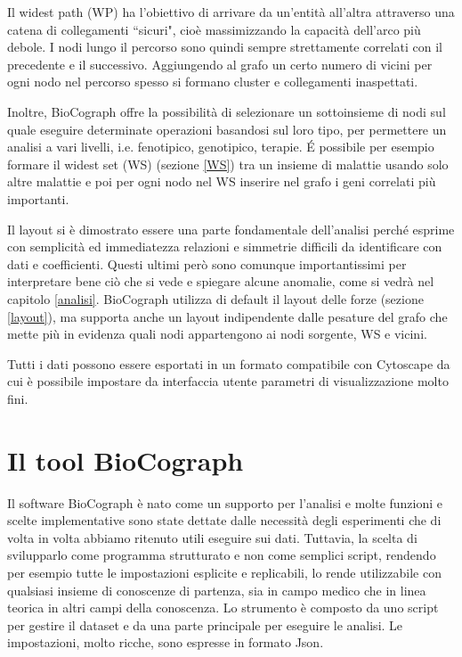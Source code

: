 \documentclass[12pt]{report}
\newcommand{\quotes}[1]{``#1"}
\begin{document}
Il widest path (WP) ha l'obiettivo di arrivare da un'entità all'altra attraverso una catena di collegamenti \quotes{sicuri}, cioè massimizzando la capacità dell'arco più debole. I nodi lungo il percorso sono quindi sempre strettamente correlati con il precedente e il successivo. Aggiungendo al grafo un certo numero di vicini per ogni nodo nel percorso spesso si formano cluster e collegamenti inaspettati.

Inoltre, BioCograph offre la possibilità di selezionare un sottoinsieme di nodi sul quale eseguire determinate operazioni basandosi sul loro tipo, per permettere un analisi a vari livelli, i.e. fenotipico, genotipico, terapie. \'E possibile per esempio formare il widest set (WS) (sezione \ref{WS}) tra un insieme di malattie usando solo altre malattie e poi per ogni nodo nel WS inserire nel grafo i geni correlati più importanti.

Il layout si è dimostrato essere una parte fondamentale dell'analisi perché esprime con semplicità ed immediatezza relazioni e simmetrie difficili da identificare con dati e coefficienti. Questi ultimi però sono comunque importantissimi per interpretare bene ciò che si vede e spiegare alcune anomalie, come si vedrà nel capitolo \ref{analisi}. BioCograph utilizza di default il layout delle forze (sezione \ref{layout}), ma supporta anche un layout indipendente dalle pesature del grafo che mette più in evidenza quali nodi appartengono ai nodi sorgente, WS e vicini.

Tutti i dati possono essere esportati in un formato compatibile con Cytoscape da cui è possibile impostare da interfaccia utente parametri di visualizzazione molto fini.



\chapter{Il tool BioCograph}
 Il software BioCograph è nato come un supporto per l'analisi e molte funzioni e scelte implementative sono state dettate dalle necessità degli esperimenti che di volta in volta abbiamo ritenuto utili eseguire sui dati. Tuttavia, la scelta di svilupparlo come programma strutturato e non come semplici script, rendendo per esempio tutte le impostazioni esplicite e replicabili, lo rende utilizzabile con qualsiasi insieme di conoscenze di partenza, sia in campo medico che in linea teorica in altri campi della conoscenza.
 Lo strumento è composto da uno script per gestire il dataset e da una parte principale per eseguire le analisi. Le impostazioni, molto ricche, sono espresse in formato Json.
\end{document}
